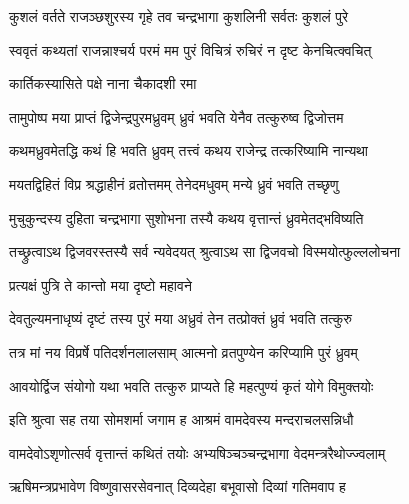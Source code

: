 
\twolineshloka
{कुशलं वर्तते राजञ्छशुरस्य गृहे तव}
{चन्द्रभागा कुशलिनी सर्वतः कुशलं पुरे} %

\twolineshloka
{स्ववृतं कथ्यतां राजन्नाश्चर्य परमं मम}
{पुरं विचित्रं रुचिरं न दृष्ट केनचित्क्वचित्} %



\onelineshloka
{कार्तिकस्यासिते पक्षे नाना चैकादशी रमा} %

\twolineshloka
{तामुपोष्प मया प्राप्तं द्विजेन्द्रपुरमध्रुवम्}
{ध्रुवं भवति येनैव तत्कुरुष्व द्विजोत्तम} %


\twolineshloka
{कथमध्रुवमेतद्धि कथं हि भवति ध्रुवम्}
{तत्त्वं कथय राजेन्द्र तत्करिष्यामि नान्यथा} %


\twolineshloka
{मयतद्विहितं विप्र श्रद्धाहीनं व्रतोत्तमम्}
{तेनेदमधुवम् मन्ये ध्रुवं भवति तच्छृणु} %

\twolineshloka
{मुचुकुन्दस्य दुहिता चन्द्रभागा सुशोभना}
{तस्यै कथय वृत्तान्तं ध्रुवमेतद्भविष्यति} %

\twolineshloka
{तच्छ्रुत्वाऽथ द्विजवरस्तस्यै सर्व न्यवेदयत्}
{श्रुत्वाऽथ सा द्विजवचो विस्मयोत्फुल्ललोचना} %



\onelineshloka
{प्रत्यक्षं पुत्रि ते कान्तो मया दृष्टो महावने} %

\twolineshloka
{देवतुल्यमनाधृष्यं दृष्टं तस्य पुरं मया}
{अध्रुवं तेन तत्प्रोक्तं ध्रुवं भवति तत्कुरु} %


\twolineshloka
{तत्र मां नय विप्रर्षे पतिदर्शनलालसाम्}
{आत्मनो व्रतपुण्येन करिप्यामि पुरं ध्रुवम्} %

\twolineshloka
{आवयोर्द्विज संयोगो यथा भवति तत्कुरु}
{प्राप्यते हि महत्पुण्यं कृतं योगे विमुक्तयोः} %

\twolineshloka
{इति श्रुत्वा सह तया सोमशर्मा जगाम ह}
{आश्रमं वामदेवस्य मन्दराचलसन्निधौ} %

\twolineshloka
{वामदेवोऽशृणोत्सर्व वृत्तान्तं कथितं तयोः}
{अभ्यषिञ्चञ्चन्द्रभागा वेदमन्त्ररैथोज्ज्वलाम्} %

\twolineshloka
{ऋषिमन्त्रप्रभावेण विष्णुवासरसेवनात्}
{दिव्यदेहा बभूवासो दिव्यां गतिमवाप ह} %


